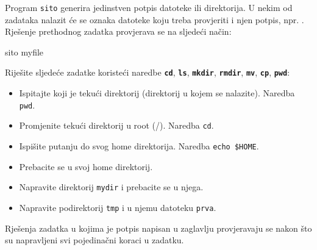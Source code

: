 \noindent Program \texttt{sito} generira jedinstven potpis datoteke ili direktorija. U nekim od zadataka nalazit će se oznaka datoteke koju treba provjeriti i njen potpis, npr. . Rješenje prethodnog zadatka provjerava se na sljedeći način:

\begin{prototip}
	sito myfile
\end{prototip}

\begin{zadatak} Riješite sljedeće zadatke koristeći naredbe \textbf{\texttt{cd}}, \textbf{\texttt{ls}}, \textbf{\texttt{mkdir}}, \textbf{\texttt{rmdir}}, \textbf{\texttt{mv}}, \textbf{\texttt{cp}}, \textbf{\texttt{pwd}}:

\begin{itemize}
\item Ispitajte koji je tekući direktorij (direktorij u kojem se nalazite). Naredba \texttt{pwd}.
\item Promjenite tekući direktorij u root (/). Naredba \texttt{cd}.
\item Ispišite putanju do svog home direktorija. Naredba \texttt{echo \$HOME}.
\end{itemize}
\end{zadatak}

\begin{zadatak} 
\begin{itemize} 
	\item Prebacite se u svoj home direktorij.
	\item Napravite direktorij \texttt{mydir}  i prebacite se u njega.
	\item Napravite podirektorij \texttt{tmp} i u njemu datoteku \texttt{prva}. 
\end{itemize}
Rješenja zadatka u kojima je potpis napisan u zaglavlju provjeravaju se nakon što su napravljeni svi pojedinačni koraci u zadatku.
\end{zadatak}

